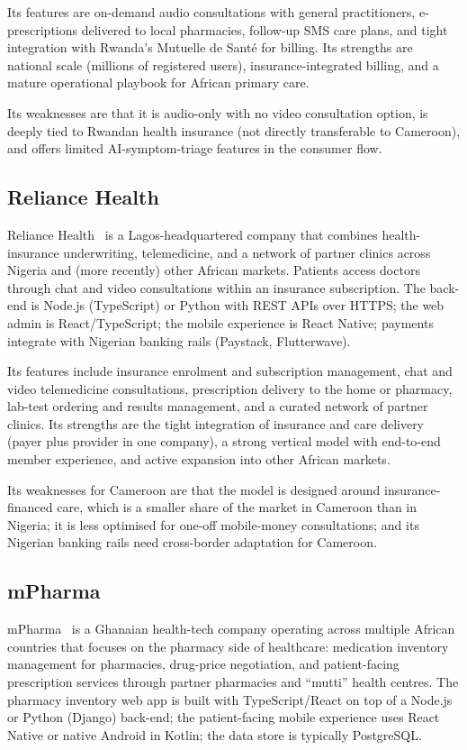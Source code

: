 Its features are on-demand audio consultations with general practitioners, e-prescriptions delivered to local pharmacies, follow-up SMS care plans, and tight integration with Rwanda's Mutuelle de Sant\'e for billing. Its strengths are national scale (millions of registered users), insurance-integrated billing, and a mature operational playbook for African primary care.

Its weaknesses are that it is audio-only with no video consultation option, is deeply tied to Rwandan health insurance (not directly transferable to Cameroon), and offers limited AI-symptom-triage features in the consumer flow.

\subsection{Reliance Health}

Reliance Health~\cite{reliance_health} is a Lagos-headquartered company that combines health-insurance underwriting, telemedicine, and a network of partner clinics across Nigeria and (more recently) other African markets. Patients access doctors through chat and video consultations within an insurance subscription. The back-end is Node.js (TypeScript) or Python with REST APIs over HTTPS; the web admin is React/TypeScript; the mobile experience is React Native; payments integrate with Nigerian banking rails (Paystack, Flutterwave).

Its features include insurance enrolment and subscription management, chat and video telemedicine consultations, prescription delivery to the home or pharmacy, lab-test ordering and results management, and a curated network of partner clinics. Its strengths are the tight integration of insurance and care delivery (payer plus provider in one company), a strong vertical model with end-to-end member experience, and active expansion into other African markets.

Its weaknesses for Cameroon are that the model is designed around insurance-financed care, which is a smaller share of the market in Cameroon than in Nigeria; it is less optimised for one-off mobile-money consultations; and its Nigerian banking rails need cross-border adaptation for Cameroon.

\subsection{mPharma}

mPharma~\cite{mpharma} is a Ghanaian health-tech company operating across multiple African countries that focuses on the pharmacy side of healthcare: medication inventory management for pharmacies, drug-price negotiation, and patient-facing prescription services through partner pharmacies and ``mutti'' health centres. The pharmacy inventory web app is built with TypeScript/React on top of a Node.js or Python (Django) back-end; the patient-facing mobile experience uses React Native or native Android in Kotlin; the data store is typically PostgreSQL.

